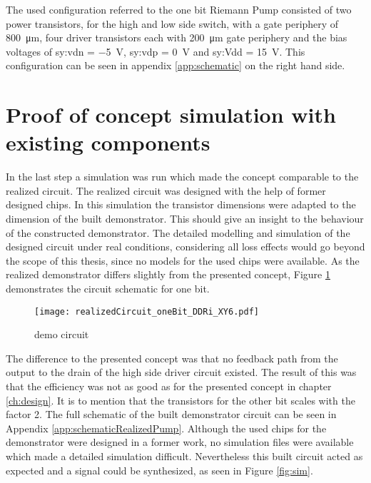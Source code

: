 The used configuration referred to the one bit Riemann Pump consisted of two power transistors, for the high and low side switch, with a gate periphery of \SI{800}{\micro \meter}, four driver transistors each with \SI{200}{\micro \meter} gate periphery and the bias voltages of \gls{sy:vdn} = \SI{-5}{\volt}, \gls{sy:vdp} = \SI{0}{\volt} and \gls{sy:Vdd} = \SI{15}{\volt}.
This configuration can be seen in appendix \ref{app:schematic} on the right hand side.

\newpage
\section{Proof of concept simulation with existing components}
\label{ch:ProofOfConceptWithExistingComponents}
In the last step a simulation was run which made the concept comparable to the realized circuit. 
The realized circuit was designed with the help of former designed chips.
In this simulation the transistor dimensions were adapted to the dimension of the built demonstrator. 
This should give an insight to the behaviour of the constructed demonstrator.
The detailed modelling and simulation of the designed circuit under real conditions, considering all loss effects would go beyond the scope of this thesis, since no models for the used chips were available.
As the realized demonstrator differs slightly from the presented concept, Figure \ref{fig:democircuit} demonstrates the circuit schematic for one bit.
\begin{figure}[htb!]
	\centering
  \texttt{[image: realizedCircuit\_oneBit\_DDRi\_XY6.pdf]}
	\caption{demo circuit}
	\label{fig:democircuit}
\end{figure}

The difference to the presented concept was that no feedback path from the output to the drain of the high side driver circuit existed.
The result of this was that the efficiency was not as good as for the presented concept in chapter \ref{ch:design}.
It is to mention that the transistors for the other bit scales with the factor 2.
The full schematic of the built demonstrator circuit can be seen in Appendix \ref{app:schematicRealizedPump}.
Although the used chips for the demonstrator were designed in a former work, no simulation files were available which made a detailed simulation difficult.
Nevertheless this built circuit acted as expected and a signal could be synthesized, as seen in Figure \ref{fig:sim}.


